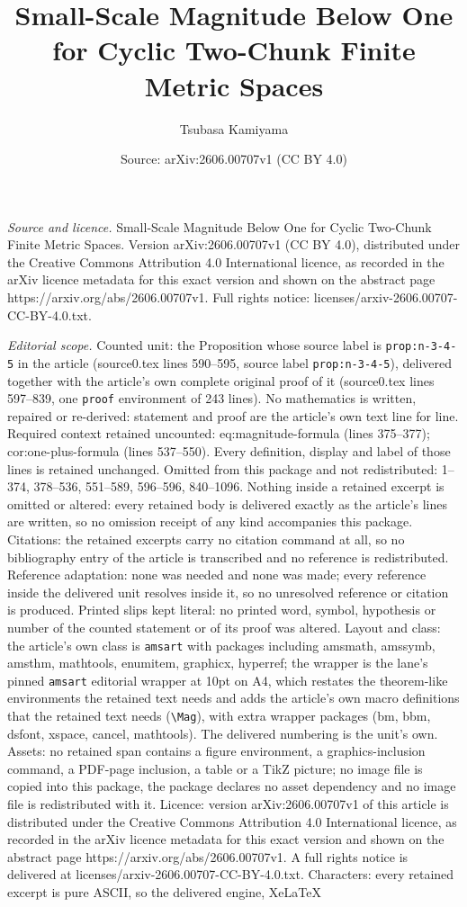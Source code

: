 \documentclass[10pt,a4paper]{amsart}
\title[Small-Scale Magnitude Below One for Cyclic Two-Chunk Finite ]{Small-Scale Magnitude Below One for Cyclic Two-Chunk Finite Metric Spaces}
\author{Tsubasa Kamiyama}
\date{Source: arXiv:2606.00707v1 (CC BY 4.0)}
\begin{document}
\maketitle

\noindent\emph{Source and licence.} Small-Scale Magnitude Below One for Cyclic Two-Chunk Finite Metric Spaces. Version arXiv:2606.00707v1 (CC BY 4.0), distributed under the Creative Commons Attribution 4.0 International licence, as recorded in the arXiv licence metadata for this exact version and shown on the abstract page https://arxiv.org/abs/2606.00707v1. Full rights notice: licenses/arxiv-2606.00707-CC-BY-4.0.txt.\par\smallskip

\noindent\textit{Editorial scope.} Counted unit: the Proposition whose source label is \texttt{prop:n-3-4-5} in the article (source0.tex lines 590--595, source label \texttt{prop:n-3-4-5}), delivered together with the article's own complete original proof of it (source0.tex lines 597--839, one \texttt{proof} environment of 243 lines). No mathematics is written, repaired or re-derived: statement and proof are the article's own text line for line. Required context retained uncounted: eq:magnitude-formula (lines 375--377); cor:one-plus-formula (lines 537--550). Every definition, display and label of those lines is retained unchanged. Omitted from this package and not redistributed: 1--374, 378--536, 551--589, 596--596, 840--1096. Nothing inside a retained excerpt is omitted or altered: every retained body is delivered exactly as the article's lines are written, so no omission receipt of any kind accompanies this package. Citations: the retained excerpts carry no citation command at all, so no bibliography entry of the article is transcribed and no reference is redistributed. Reference adaptation: none was needed and none was made; every reference inside the delivered unit resolves inside it, so no unresolved reference or citation is produced. Printed slips kept literal: no printed word, symbol, hypothesis or number of the counted statement or of its proof was altered. Layout and class: the article's own class is \texttt{amsart} with packages including amsmath, amssymb, amsthm, mathtools, enumitem, graphicx, hyperref; the wrapper is the lane's pinned \texttt{amsart} editorial wrapper at 10pt on A4, which restates the theorem-like environments the retained text needs and adds the article's own macro definitions that the retained text needs (\texttt{\textbackslash Mag}), with extra wrapper packages (bm, bbm, dsfont, xspace, cancel, mathtools). The delivered numbering is the unit's own. Assets: no retained span contains a figure environment, a graphics-inclusion command, a PDF-page inclusion, a table or a TikZ picture; no image file is copied into this package, the package declares no asset dependency and no image file is redistributed with it. Licence: version arXiv:2606.00707v1 of this article is distributed under the Creative Commons Attribution 4.0 International licence, as recorded in the arXiv licence metadata for this exact version and shown on the abstract page https://arxiv.org/abs/2606.00707v1. A full rights notice is delivered at licenses/arxiv-2606.00707-CC-BY-4.0.txt. Characters: every retained excerpt is pure ASCII, so the delivered engine, XeLaTeX 
\end{document}
